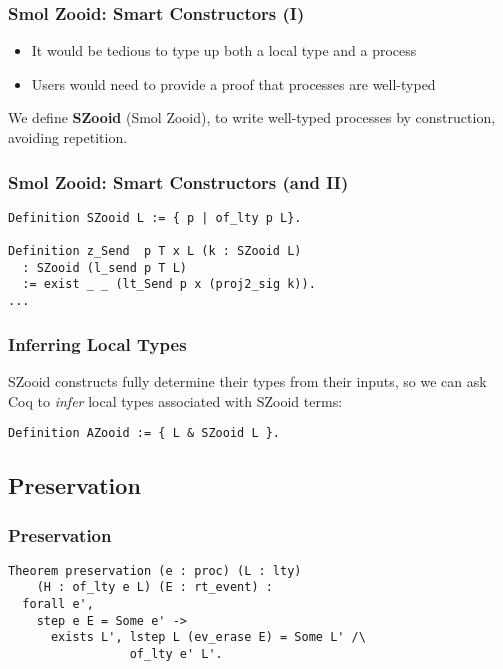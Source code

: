 \begin{frame}[fragile]
    \frametitle{Smol Zooid: Smart Constructors (I)}
    \begin{sticky}
\vspace{-.5cm}
    \begin{itemize}
        \item It would be tedious to type up both a local type and a process
        \item Users would need to provide a proof that processes are well-typed
    \end{itemize}
    \end{sticky}
    \begin{greenbox}{}
        We define \textbf{SZooid} (Smol Zooid), to write
well-typed processes by construction, avoiding repetition.
    \end{greenbox}
\end{frame}

\begin{frame}[fragile]
    \frametitle{Smol Zooid: Smart Constructors (and II)}
\begin{verbatim}
Definition SZooid L := { p | of_lty p L}.

Definition z_Send  p T x L (k : SZooid L)
  : SZooid (l_send p T L)
  := exist _ _ (lt_Send p x (proj2_sig k)).
...
\end{verbatim}
\end{frame}

\begin{frame}[fragile]
    \frametitle{Inferring Local Types}
    SZooid constructs fully determine their types from their inputs, so we can ask Coq to \emph{infer} local types
associated with SZooid terms:
\vspace{1cm}
\begin{verbatim}
Definition AZooid := { L & SZooid L }.
\end{verbatim}
\end{frame}

\subsection{Preservation}

\begin{frame}[fragile]
\frametitle{Preservation}
\begin{verbatim}
Theorem preservation (e : proc) (L : lty) 
    (H : of_lty e L) (E : rt_event) :
  forall e',
    step e E = Some e' ->
      exists L', lstep L (ev_erase E) = Some L' /\
                 of_lty e' L'.
\end{verbatim}
\end{frame}

